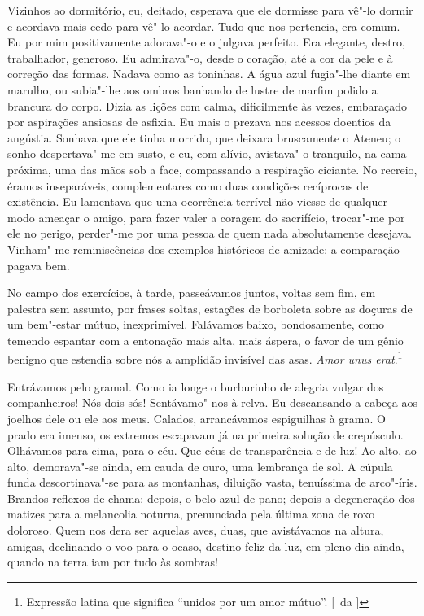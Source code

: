Vizinhos ao dormitório, eu, deitado, esperava que ele dormisse
para vê"-lo dormir e acordava mais cedo para vê"-lo acordar. Tudo que
nos pertencia, era comum. Eu por mim positivamente adorava"-o e o
julgava perfeito. Era elegante, destro, trabalhador, generoso. Eu
admirava"-o, desde o coração, até a cor da pele e à correção das
formas. Nadava como as toninhas. A água azul fugia"-lhe diante em
marulho, ou subia"-lhe aos ombros banhando de lustre de marfim polido
a brancura do corpo. Dizia as lições com calma, dificilmente às vezes,
embaraçado por aspirações ansiosas de asfixia. Eu mais o prezava nos
acessos doentios da angústia. Sonhava que ele tinha morrido, que
deixara bruscamente o Ateneu; o sonho despertava"-me em susto, e eu,
com alívio, avistava"-o tranquilo, na cama próxima, uma das mãos sob a
face, compassando a respiração ciciante. No recreio, éramos
inseparáveis, complementares como duas condições recíprocas de
existência. Eu lamentava que uma ocorrência terrível não viesse de
qualquer modo ameaçar o amigo, para fazer valer a coragem do
sacrifício, trocar"-me por ele no perigo, perder"-me por uma pessoa
de quem nada absolutamente desejava. Vinham"-me reminiscências dos
exemplos históricos de amizade; a comparação pagava bem. 

No campo dos exercícios, à tarde, passeávamos juntos, voltas sem fim, em palestra
sem assunto, por frases soltas, estações de borboleta sobre as doçuras
de um bem"-estar mútuo, inexprimível. Falávamos baixo, bondosamente,
como temendo espantar com a entonação mais alta, mais áspera, o favor
de um gênio benigno que estendia sobre nós a amplidão invisível das
asas. \textit{Amor unus erat}.\footnote{ Expressão latina que significa 
``unidos por um amor mútuo''. [~da ]} 

Entrávamos pelo gramal. Como ia longe o
burburinho de alegria vulgar dos companheiros! Nós dois sós!
Sentávamo"-nos à relva. Eu descansando a cabeça aos joelhos dele ou
ele aos meus. Calados, arrancávamos espiguilhas à grama. O prado era
imenso, os extremos escapavam já na primeira solução de crepúsculo.
Olhávamos para cima, para o céu. Que céus de transparência e de luz! Ao
alto, ao alto, demorava"-se ainda, em cauda de ouro, uma lembrança de
sol. A cúpula funda descortinava"-se para as montanhas, diluição
vasta, tenuíssima de arco"-íris. Brandos reflexos de chama; depois, o
belo azul de pano; depois a degeneração dos matizes para a melancolia
noturna, prenunciada pela última zona de roxo doloroso. Quem nos dera
ser aquelas aves, duas, que avistávamos na altura, amigas, declinando o
voo para o ocaso, destino feliz da luz, em pleno dia ainda, quando na
terra iam por tudo às sombras! 


